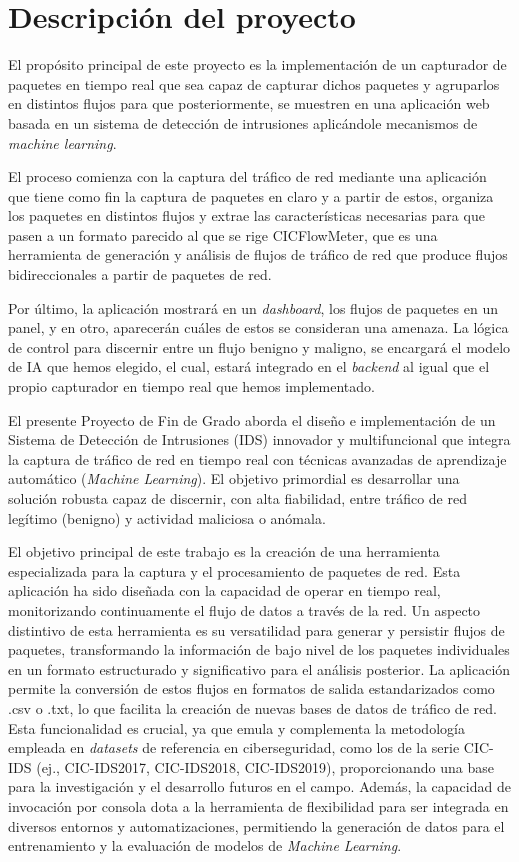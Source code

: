 \section{Descripción del proyecto}
El propósito principal de este proyecto es la implementación de un capturador de paquetes en tiempo real que sea capaz de capturar dichos paquetes y agruparlos en distintos flujos para que posteriormente, se muestren en una aplicación web basada en un sistema de detección de intrusiones aplicándole mecanismos de \textit{machine learning}.

El proceso comienza con la captura del tráfico de red mediante una aplicación que tiene como fin la captura de paquetes en claro y a partir de estos, organiza los paquetes en distintos flujos y extrae las características necesarias para que pasen a un formato parecido al que se rige CICFlowMeter, que es una herramienta de generación y análisis de flujos de tráfico de red que produce flujos bidireccionales a partir de paquetes de red.

Por último, la aplicación mostrará en un \textit{dashboard}, los flujos de paquetes en un panel, y en otro, aparecerán cuáles de estos se consideran una amenaza. La lógica de control para discernir entre un flujo benigno y maligno, se encargará el modelo de IA que hemos elegido, el cual, estará integrado en el \textit{backend} al igual que el propio capturador en tiempo real que hemos implementado.

El presente Proyecto de Fin de Grado aborda el diseño e implementación de un Sistema de Detección de Intrusiones (IDS) innovador y multifuncional que integra la captura de tráfico de red en tiempo real con técnicas avanzadas de aprendizaje automático (\textit{Machine Learning}). El objetivo primordial es desarrollar una solución robusta capaz de discernir, con alta fiabilidad, entre tráfico de red legítimo (benigno) y actividad maliciosa o anómala.

El objetivo principal de este trabajo es la creación de una herramienta especializada para la captura y el procesamiento de paquetes de red. Esta aplicación ha sido diseñada con la capacidad de operar en tiempo real, monitorizando continuamente el flujo de datos a través de la red. Un aspecto distintivo de esta herramienta es su versatilidad para generar y persistir flujos de paquetes, transformando la información de bajo nivel de los paquetes individuales en un formato estructurado y significativo para el análisis posterior. La aplicación permite la conversión de estos flujos en formatos de salida estandarizados como .csv o .txt, lo que facilita la creación de nuevas bases de datos de tráfico de red. Esta funcionalidad es crucial, ya que emula y complementa la metodología empleada en \textit{datasets} de referencia en ciberseguridad, como los de la serie CIC-IDS (ej., CIC-IDS2017, CIC-IDS2018, CIC-IDS2019), proporcionando una base para la investigación y el desarrollo futuros en el campo. Además, la capacidad de invocación por consola dota a la herramienta de flexibilidad para ser integrada en diversos entornos y automatizaciones, permitiendo la generación de datos para el entrenamiento y la evaluación de modelos de \textit{Machine Learning}.

